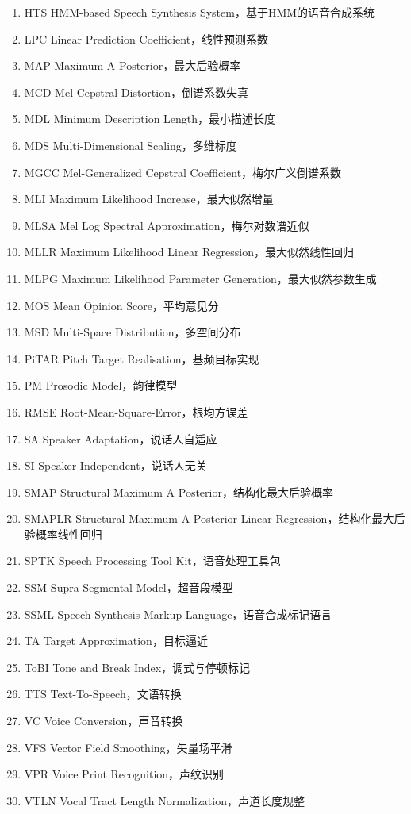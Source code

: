 \begin{enumerate}
    \item HTS HMM-based Speech Synthesis System，基于HMM的语音合成系统
    \item LPC Linear Prediction Coefficient，线性预测系数
    \item MAP Maximum A Posterior，最大后验概率
    \item MCD Mel-Cepstral Distortion，倒谱系数失真
    \item MDL Minimum Description Length，最小描述长度
    \item MDS Multi-Dimensional Scaling，多维标度
    \item MGCC Mel-Generalized Cepstral Coefficient，梅尔广义倒谱系数
    \item MLI Maximum Likelihood Increase，最大似然增量
    \item MLSA Mel Log Spectral Approximation，梅尔对数谱近似
    \item MLLR Maximum Likelihood Linear Regression，最大似然线性回归
    \item MLPG Maximum Likelihood Parameter Generation，最大似然参数生成
    \item MOS Mean Opinion Score，平均意见分
    \item MSD Multi-Space Distribution，多空间分布
    \item PiTAR Pitch Target Realisation，基频目标实现
    \item PM Prosodic Model，韵律模型
    \item RMSE Root-Mean-Square-Error，根均方误差
    \item SA Speaker Adaptation，说话人自适应
    \item SI Speaker Independent，说话人无关
    \item SMAP Structural Maximum A Posterior，结构化最大后验概率
    \item SMAPLR Structural Maximum A Posterior Linear Regression，结构化最大后验概率线性回归
    \item SPTK Speech Processing Tool Kit，语音处理工具包
    \item SSM Supra-Segmental Model，超音段模型
    \item SSML Speech Synthesis Markup Language，语音合成标记语言
    \item TA Target Approximation，目标逼近
    \item ToBI Tone and Break Index，调式与停顿标记
    \item TTS Text-To-Speech，文语转换
    \item VC Voice Conversion，声音转换
    \item VFS Vector Field Smoothing，矢量场平滑
    \item VPR Voice Print Recognition，声纹识别
    \item VTLN Vocal Tract Length Normalization，声道长度规整
\end{enumerate}
